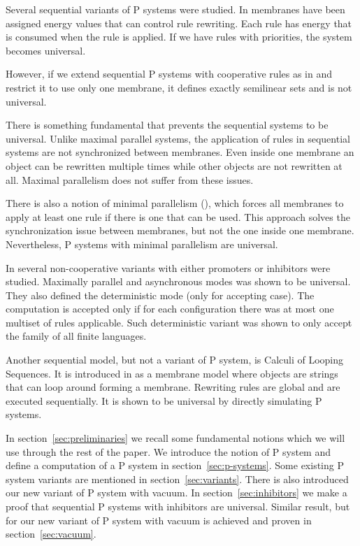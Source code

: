 \documentclass[a4paper,10pt]{article}
\begin{document}

Several sequential variants of P systems were studied. In \cite{Freund:2004:SPS:2149813.2149831} membranes have been assigned energy values that can control rule rewriting. Each rule has energy that is consumed when the rule is applied. If we have rules with priorities, the system becomes universal.


However, if we extend sequential P systems with cooperative rules as in \cite{Dang04onp} and restrict it to use only one membrane, it defines exactly semilinear sets and is not universal.

There is something fundamental that prevents the sequential systems to be universal. Unlike maximal parallel systems, the application of rules in sequential systems are not synchronized between membranes. Even inside one membrane an object can be rewritten multiple times while other objects are not rewritten at all.
Maximal parallelism does not suffer from these issues.

There is also a notion of minimal parallelism (\cite{Ciobanu:2007:PSM:1243519.1243811}), which forces all membranes to apply at least one rule if there is one that can be used. This approach solves the synchronization issue between membranes, but not the one inside one membrane. Nevertheless, P systems with minimal parallelism are universal.




In \cite{Alhazov13} several non-cooperative variants with either promoters or inhibitors were studied. Maximally parallel and asynchronous modes was shown to be universal. They also defined the deterministic mode (only for accepting case). The computation is accepted only if for each configuration there was at most one multiset of rules applicable. Such deterministic variant was shown to only accept the family of all finite languages.


Another sequential model, but not a variant of P system, is Calculi of Looping Sequences. It is introduced in \cite{Barbuti07thecalculus} as a membrane model where objects are strings that can loop around forming a membrane. Rewriting rules are global and are executed sequentially. It is shown to be universal by directly simulating P systems.


In section~\ref{sec:preliminaries} we recall some fundamental notions which we will use through the rest of the paper.
We introduce the notion of P system and define a computation of a P system in section~\ref{sec:p-systems}.
Some existing P system variants are mentioned in section~\ref{sec:variants}. There is also introduced our new variant of P system with vacuum.
In section~\ref{sec:inhibitors} we make a proof that sequential P systems with inhibitors are universal.
Similar result, but for our new variant of P system with vacuum is achieved and proven in section~\ref{sec:vacuum}.
\end{document}
